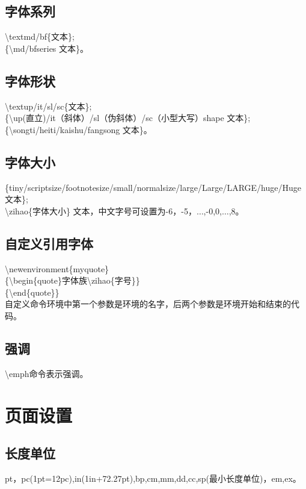 \documentclass{book}%
\begin{document}
    \section{字体系列}
    \textbackslash textmd/bf\{文本\};\\
    \{\textbackslash md/bfseries 文本\}。
    
    \section{字体形状}
    \textbackslash textup/it/sl/sc\{文本\};\\
    \{\textbackslash up(直立)/it（斜体）/sl（伪斜体）/sc（小型大写）shape 文本\};\\
    \{\textbackslash songti/heiti/kaishu/fangsong 文本\}。\\
    
    \section{字体大小}
    \{tiny/scriptsize/footnotesize/small/normalsize/large/Large/LARGE/huge/Huge 文本\};\\
    \textbackslash zihao\{字体大小\} 文本，中文字号可设置为-6，-5，$\ldots$,-0,0,$\ldots$,8。\\
    
    \section{自定义引用字体}
    \textbackslash newenvironment\{myquote\}\\
    \{\textbackslash begin\{quote\}字体族\textbackslash zihao\{字号\}\}\\
    \{\textbackslash end\{quote\}\}\\
    自定义命令环境中第一个参数是环境的名字，后两个参数是环境开始和结束的代码。
    
    \section{强调}
    \textbackslash emph命令表示强调。
    
    \chapter{页面设置}
    
    \section{长度单位}
    pt，pc(1pt=12pc),in(1in+72.27pt),bp,cm,mm,dd,cc,sp(最小长度单位)，em,ex。
    
\end{document}
